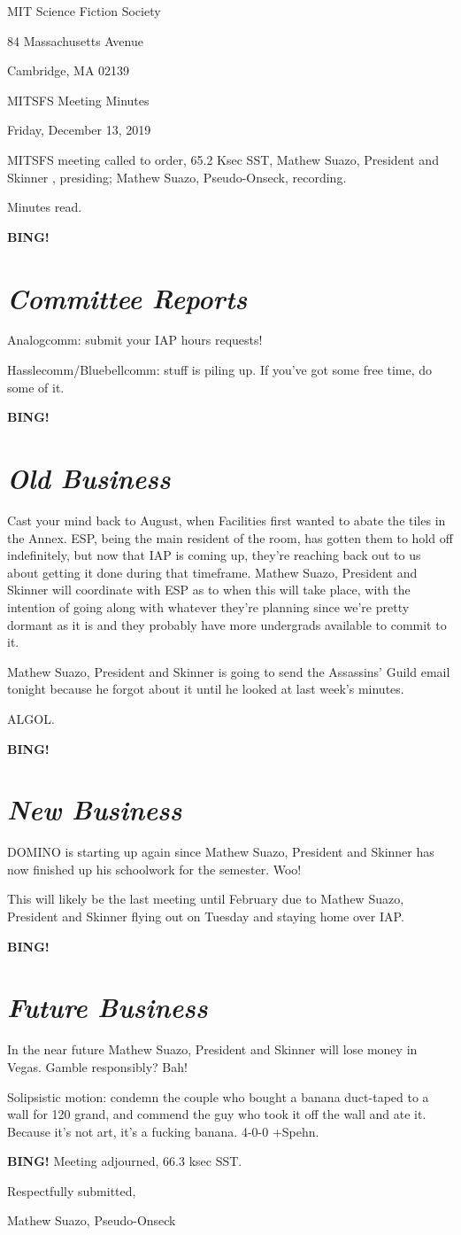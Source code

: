 \documentclass[10pt]{article}
\newcommand{\bing}{{\bf BING!} }
\newcommand{\goto}[1]{\bing \vskip 12pt \section*{{\em{#1}}}}
\newcommand{\skinner}{Mathew Suazo, President and Skinner }
\newcommand{\onseck}{Mathew Suazo, Pseudo-Onseck}
\newcommand{\meetingdate}{Friday, December 13, 2019 }
\begin{document}
\begin{center}

MIT Science Fiction Society

84 Massachusetts Avenue

Cambridge, MA 02139

\vspace{12pt}

MITSFS Meeting Minutes

\meetingdate

\end{center}

\vspace{18pt}

\setlength{\parskip}{6pt}

\noindent
MITSFS meeting called to order, 65.2 Ksec SST,
\skinner, presiding; \onseck, recording.

Minutes read.

\goto{Committee Reports}

Analogcomm: submit your IAP hours requests!

Hasslecomm/Bluebellcomm: stuff is piling up. If you've got some free time, do some of it.

\goto{Old Business}

Cast your mind back to August, when Facilities first wanted to abate the tiles in the Annex. ESP, being the main resident of the room, has gotten them to hold off indefinitely, but now that IAP is coming up, they're reaching back out to us about getting it done during that timeframe. \skinner will coordinate with ESP as to when this will take place, with the intention of going along with whatever they're planning since we're pretty dormant as it is and they probably have more undergrads available to commit to it.

\skinner is going to send the Assassins' Guild email tonight because he forgot about it until he looked at last week's minutes.

ALGOL.

\goto{New Business}

DOMINO is starting up again since \skinner has now finished up his schoolwork for the semester. Woo!

This will likely be the last meeting until February due to \skinner flying out on Tuesday and staying home over IAP.

\goto{Future Business}

In the near future \skinner will lose money in Vegas. Gamble responsibly? Bah!

Solipsistic motion: condemn the couple who bought a banana duct-taped to a wall for 120 grand, and commend the guy who took it off the wall and ate it. Because it's not art, it's a fucking banana. 4-0-0 +Spehn.

\bing
\noindent
Meeting adjourned, 66.3 ksec SST.

\vspace{18pt}

\centerline{Respectfully submitted,}
\centerline{\onseck}
\end{document}
